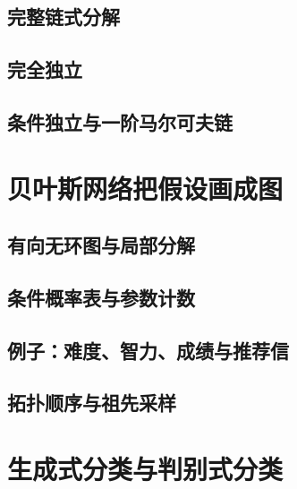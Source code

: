 \subsection{完整链式分解}
\label{subsec:prob-chain-rule}
\contentplaceholder

\subsection{完全独立}
\label{subsec:prob-independence}
\contentplaceholder

\subsection{条件独立与一阶马尔可夫链}
\label{subsec:prob-markov}
\contentplaceholder

\section{贝叶斯网络把假设画成图}
\label{sec:prob-bayesian-networks}
\contentplaceholder

\subsection{有向无环图与局部分解}
\label{subsec:prob-dag}
\contentplaceholder

\subsection{条件概率表与参数计数}
\label{subsec:prob-cpt}
\contentplaceholder

\subsection{例子：难度、智力、成绩与推荐信}
\label{subsec:prob-student-example}
\contentplaceholder

\subsection{拓扑顺序与祖先采样}
\label{subsec:prob-ancestral-sampling}
\contentplaceholder

\section{生成式分类与判别式分类}
\label{sec:prob-classification}
\contentplaceholder

